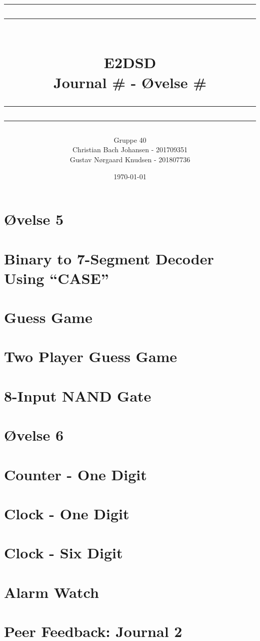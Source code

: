 \documentclass[12pt,a4paper]{article}
\newcommand\mymaketitle[1]{
   \rule{\textwidth}{1.6pt}\vspace*{-\baselineskip}\vspace*{2pt}
   \rule{\textwidth}{0.4pt}
   \\  
   \huge \bf #1\\
   \vspace{-8pt}
   \rule{\textwidth}{0.4pt}\vspace*{-\baselineskip}\vspace{3.2pt}
   \rule{\textwidth}{1.6pt}
}
\begin{document}
\title{
	\mymaketitle{E2DSD\\Journal \# - Øvelse \#}
}
\author{
	Gruppe 40\\
	Christian Bach Johansen - 201709351\\
	Gustav Nørgaard Knudsen - 201807736
}
\date{\today}

\maketitle

\section*{Øvelse 5}

\section{Binary to 7-Segment Decoder Using “CASE”}


\section{Guess Game}


\section{Two Player Guess Game}


\section{8-Input NAND Gate}


\section*{Øvelse 6}

\section{Counter - One Digit}


\section{Clock - One Digit}


\section{Clock - Six Digit}


\section{Alarm Watch}


\section{Peer Feedback: Journal 2}
\end{document}

